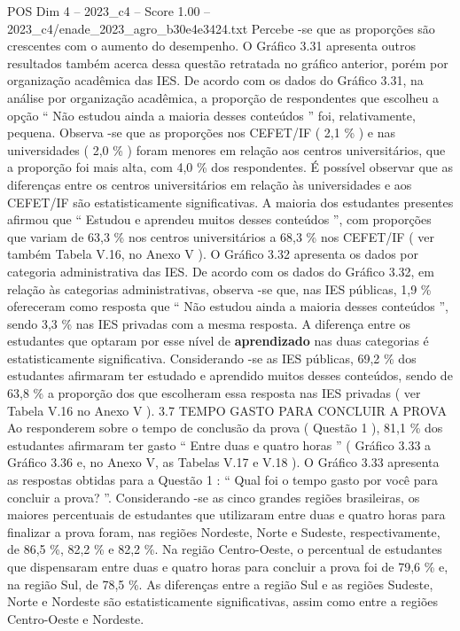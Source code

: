 \begin{textsample}{POS Dim 4 – 2023\_c4 – Score 1.00 – 2023\_c4/enade\_2023\_agro\_b30e4e3424.txt}
Percebe -se que as proporções são crescentes com o aumento do desempenho.
O Gráfico 3.31 apresenta outros resultados também acerca dessa questão retratada no gráfico anterior, porém por organização acadêmica das IES.
De acordo com os dados do Gráfico 3.31, na análise por organização acadêmica, a proporção de respondentes que escolheu a opção “ Não estudou ainda a maioria desses conteúdos ” foi, relativamente, pequena.
Observa -se que as proporções nos CEFET/IF ( 2,1 \% ) e nas universidades ( 2,0 \% ) foram menores em relação aos centros universitários, que a proporção foi mais alta, com 4,0 \% dos respondentes.
É possível observar que as diferenças entre os centros universitários em relação às universidades e aos CEFET/IF são estatisticamente significativas.
A maioria dos estudantes presentes afirmou que “ Estudou e aprendeu muitos desses conteúdos ”, com proporções que variam de 63,3 \% nos centros universitários a 68,3 \% nos CEFET/IF ( ver também Tabela V.16, no Anexo V ).
O Gráfico 3.32 apresenta os dados por categoria administrativa das IES.
De acordo com os dados do Gráfico 3.32, em relação às categorias administrativas, observa -se que, nas IES públicas, 1,9 \% ofereceram como resposta que “ Não estudou ainda a maioria desses conteúdos ”, sendo 3,3 \% nas IES privadas com a mesma resposta.
A diferença entre os estudantes que optaram por esse nível de \textbf{aprendizado} nas duas categorias é estatisticamente significativa.
Considerando -se as IES públicas, 69,2 \% dos estudantes afirmaram ter estudado e aprendido muitos desses conteúdos, sendo de 63,8 \% a proporção dos que escolheram essa resposta nas IES privadas ( ver Tabela V.16 no Anexo V ). 3.7 TEMPO GASTO PARA CONCLUIR A PROVA Ao responderem sobre o tempo de conclusão da prova ( Questão 1 ), 81,1 \% dos estudantes afirmaram ter gasto “ Entre duas e quatro horas ” ( Gráfico 3.33 a Gráfico 3.36 e, no Anexo V, as Tabelas V.17 e V.18 ).
O Gráfico 3.33 apresenta as respostas obtidas para a Questão 1 : “ Qual foi o tempo gasto por você para concluir a prova? ”.
Considerando -se as cinco grandes regiões brasileiras, os maiores percentuais de estudantes que utilizaram entre duas e quatro horas para finalizar a prova foram, nas regiões Nordeste, Norte e Sudeste, respectivamente, de 86,5 \%, 82,2 \% e 82,2 \%.
Na região Centro-Oeste, o percentual de estudantes que dispensaram entre duas e quatro horas para concluir a prova foi de 79,6 \% e, na região Sul, de 78,5 \%.
As diferenças entre a região Sul e as regiões Sudeste, Norte e Nordeste são estatisticamente significativas, assim como entre a regiões Centro-Oeste e Nordeste.

\end{textsample}
